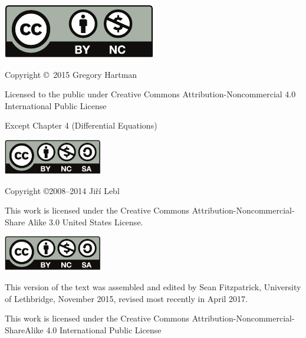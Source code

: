 \noindent\hskip -1in\begin{minipage}{2in}
\includegraphics{text/by-nc} 
\end{minipage}
\begin{minipage}{3in}
\noindent Copyright \copyright\ 2015 Gregory Hartman

Licensed to the public under Creative Commons Attribution-Noncommercial 4.0 International Public License
\end{minipage}

\bigskip

\bigskip

Except Chapter 4 (Differential Equations) 

\bigskip

\bigskip

\noindent\hskip -1in\begin{minipage}{2in}
\includegraphics[width=1.7in]{figures/license} 
\end{minipage}
\begin{minipage}{3in}
\noindent Copyright \copyright 2008--2014 Ji{\v r}\'i Lebl

This work is licensed under the Creative Commons
Attribution-Non\-commercial-Share Alike 3.0 United States License. 
\end{minipage}

\bigskip

\bigskip

\noindent\hskip-1in\begin{minipage}{2in}
\includegraphics[width=1.7in]{figures/license}
\end{minipage}
\begin{minipage}{3.3in}
This version of the text was assembled and edited by Sean Fitzpatrick, University of Lethbridge, November 2015, revised most recently in April 2017. 

This work is licensed under the Creative Commons Attribution-Noncommercial-ShareAlike 4.0 International Public License
\end{minipage}
